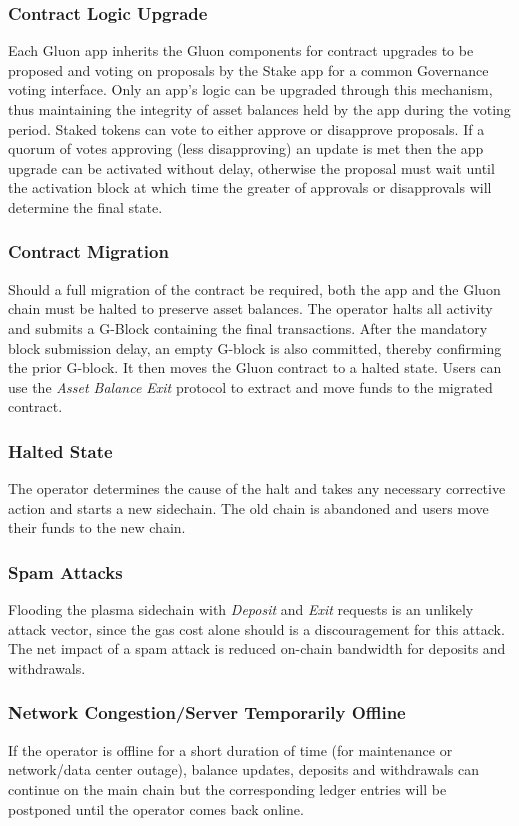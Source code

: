 \documentclass[12pt,a4paper]{article}
\begin{document}
\subsubsection{Contract Logic Upgrade}
Each Gluon app inherits the Gluon components for contract upgrades to be proposed and voting on proposals by the Stake app for a common Governance voting interface. Only an app's logic can be upgraded through this mechanism, thus maintaining the integrity of asset balances held by the app during the voting period. Staked tokens can vote to either approve or disapprove proposals. If a quorum of votes approving (less disapproving) an update is met then the app upgrade can be activated without delay, otherwise the proposal must wait until the activation block at which time the greater of approvals or disapprovals will determine the final state.

\subsubsection{Contract Migration}
Should a full migration of the contract be required, both the app and the Gluon chain must be halted to preserve asset balances. The operator halts all activity and submits a G-Block containing the final transactions. After the mandatory block submission delay, an empty G-block is also committed, thereby confirming the prior G-block. It then moves the Gluon contract to a halted state. Users can use the \emph{Asset Balance Exit} protocol to extract and move funds to the migrated contract.

\subsubsection{Halted State}
The operator determines the cause of the halt and takes any necessary corrective action and starts a new sidechain. The old chain is abandoned and users move their funds to the new chain.

\subsubsection{Spam Attacks}
Flooding the plasma sidechain with \emph{Deposit} and \emph{Exit} requests is an unlikely attack vector, since the gas cost alone should is a discouragement for this attack. The net impact of a spam attack is reduced on-chain bandwidth for deposits and withdrawals.

\subsubsection{Network Congestion/Server Temporarily Offline }
If the operator is offline for a short duration of time (for maintenance or network/data center outage), balance updates, deposits and withdrawals can continue on the main chain but the corresponding ledger entries will be postponed until the operator comes back online.
\end{document}
